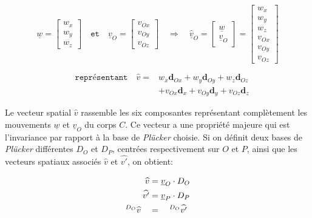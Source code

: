 \documentclass{report}
\begin{document}
\begin{minipage}{.55\textwidth}
$$
\underline{w}=
\begin{bmatrix}
w_{x} \\
w_{y} \\
w_{z}
\end{bmatrix}
\quad \texttt{et} \quad
\underline{v}_{O}=
\begin{bmatrix}
v_{Ox} \\
v_{Oy} \\
v_{Oz}
\end{bmatrix}
\quad \Rightarrow \quad
\underline{\widehat{v}}_{O}=
\begin{bmatrix}
\underline{w} \\
\underline{v}_{O}
\end{bmatrix}
=
\begin{bmatrix}
w_{x} \\
w_{y} \\
w_{z} \\
v_{Ox} \\
v_{Oy} \\
v_{Oz}
\end{bmatrix}
$$
\end{minipage}
\begin{minipage}{.45\textwidth}
\begin{align*}
\quad \texttt{représentant} \quad
\widehat{v} = 
  &w_{x}\textbf{d}_{Ox} + w_{y}\textbf{d}_{Oy} + w_{z}\textbf{d}_{Oz} \\
  &+ v_{Ox}\textbf{d}_{x} + v_{Oy}\textbf{d}_{y} + v_{Oz}\textbf{d}_{z}
\end{align*}
\end{minipage}

\vspace{0.3cm} %

Le vecteur spatial $\widehat{v}$ rassemble les six composantes représentant complètement les mouvements $\underline{w}$ et $\underline{v}_{O}$ du corps $C$. Ce vecteur a une propriété majeure qui est l'invariance par rapport à la base de \emph{Plücker} choisie. Si on définit deux bases de \emph{Plücker} différentes $D_{O}$ et $D_{P}$, centrées respectivement sur $O$ et $P$, ainsi que les vecteurs spatiaux associés $\widehat{v}$ et $\widehat{v'}$, on obtient:

\begin{align}
\widehat{v}  &= \underline{v}_{O} \cdot D_{O} \notag \\
\widehat{v'} &= \underline{v}_{P} \cdot D_{P} \notag \\
^{D_{O}}\widehat{v} \quad &= \quad ^{D_{O}}\widehat{v'}
\label{equ_invariant}
\end{align}
\end{document}

